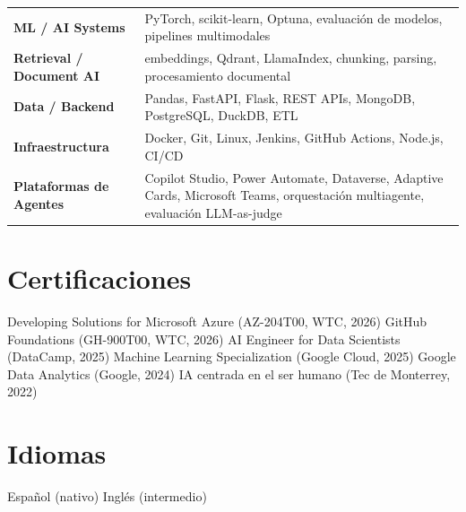 \documentclass[a4paper,10pt]{article}
\begin{document}
\begin{tabular}{@{} l l @{} }
  \textbf{ML / AI Systems} & PyTorch, scikit-learn, Optuna, evaluación de modelos, pipelines multimodales \\
  \textbf{Retrieval / Document AI} & embeddings, Qdrant, LlamaIndex, chunking, parsing, procesamiento documental \\
  \textbf{Data / Backend} & Pandas, FastAPI, Flask, REST APIs, MongoDB, PostgreSQL, DuckDB, ETL \\
  \textbf{Infraestructura} & Docker, Git, Linux, Jenkins, GitHub Actions, Node.js, CI/CD \\
  \textbf{Plataformas de Agentes} & Copilot Studio, Power Automate, Dataverse, Adaptive Cards, Microsoft Teams, orquestación multiagente, evaluación LLM-as-judge \\
\end{tabular}

\vspace{4pt}

\section*{Certificaciones}

Developing Solutions for Microsoft Azure (AZ-204T00, WTC, 2026) \textperiodcentered{}
GitHub Foundations (GH-900T00, WTC, 2026) \textperiodcentered{}
AI Engineer for Data Scientists (DataCamp, 2025) \textperiodcentered{}
Machine Learning Specialization (Google Cloud, 2025) \textperiodcentered{}
Google Data Analytics (Google, 2024) \textperiodcentered{}
IA centrada en el ser humano (Tec de Monterrey, 2022)

\vspace{2pt}

\section*{Idiomas}

Español (nativo) \textperiodcentered{} Inglés (intermedio)
\end{document}
